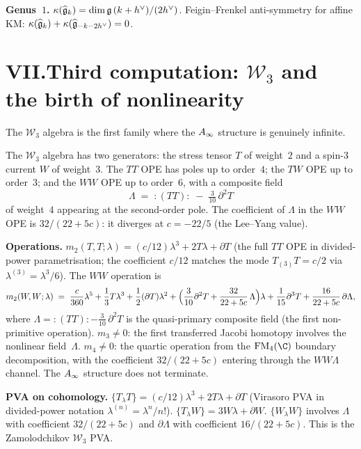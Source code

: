 \smallskip
\noindent\textbf{Genus~$1$.}\enspace
$\kappa(\widehat{\mathfrak{g}}_k) = \dim\mathfrak{g}\,(k + h^\vee)/(2h^\vee)$.
Feigin--Frenkel anti-symmetry for affine KM: $\kappa(\widehat{\mathfrak{g}}_k) + \kappa(\widehat{\mathfrak{g}}_{-k-2h^\vee}) = 0$.


\section*{VII.\quad Third computation: $\mathcal{W}_3$ and
the birth of nonlinearity}

The $\mathcal{W}_3$ algebra is the first family where the $A_\infty$
structure is genuinely infinite.

The $\mathcal{W}_3$ algebra has two generators: the stress tensor
$T$ of weight~$2$ and a spin-$3$ current $W$ of weight~$3$. The
$TT$ OPE has poles up to order~$4$; the $TW$ OPE up to order~$3$;
and the $WW$ OPE up to order~$6$, with a composite field
\[
\Lambda \;=\; :(TT): \;-\; \tfrac{3}{10}\,\partial^2 T
\]
of weight~$4$ appearing at the second-order pole. The coefficient
of $\Lambda$ in the $WW$ OPE is $32/(22 + 5c)$: it diverges at
$c = -22/5$ (the Lee--Yang value).

\smallskip
\noindent\textbf{Operations.}\enspace
$m_2(T,T;\lambda) = (c/12)\lambda^3 + 2T\lambda + \partial T$
(the full $TT$ OPE in divided-power parametrisation; the coefficient
$c/12$ matches the mode $T_{(3)}T = c/2$ via $\lambda^{(3)} = \lambda^3/6$).
The $WW$ operation is
\[
m_2(W,W;\lambda) \;=\; \frac{c}{360}\lambda^5
+ \frac{1}{3}T\lambda^3
+ \frac{1}{2}(\partial T)\lambda^2
+ \Bigl(\frac{3}{10}\partial^2 T + \frac{32}{22+5c}\,\Lambda\Bigr)\lambda
+ \frac{1}{15}\partial^3 T + \frac{16}{22+5c}\,\partial\Lambda,
\]
where $\Lambda = {}\!:(TT): - \tfrac{3}{10}\,\partial^2 T$ is the quasi-primary composite field (the first non-primitive operation). $m_3 \ne 0$: the first transferred Jacobi homotopy involves the
nonlinear field~$\Lambda$.
$m_4 \ne 0$: the quartic operation from the $\FM_4(\C)$ boundary
decomposition, with the coefficient $32/(22+5c)$ entering through
the $WW\Lambda$ channel. The $A_\infty$ structure does not terminate.

\smallskip
\noindent\textbf{PVA on cohomology.}\enspace
$\{T_\lambda T\} = (c/12)\lambda^3 + 2T\lambda + \partial T$
(Virasoro PVA in divided-power notation $\lambda^{(n)} = \lambda^n/n!$).
$\{T_\lambda W\} = 3W\lambda + \partial W$.
$\{W_\lambda W\}$ involves $\Lambda$ with coefficient
$32/(22+5c)$ and $\partial\Lambda$ with coefficient $16/(22+5c)$. This is the Zamolodchikov $\mathcal{W}_3$ PVA\@.

